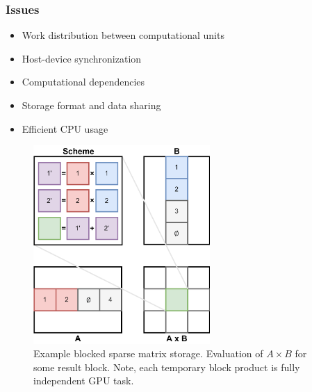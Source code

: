 \documentclass[aspectratio=169,xcolor=table,english]{beamer}
\begin{document}
\begin{frame}[fragile]
\end{frame}

\begin{frame}[fragile] \frametitle{Issues}
    \begin{minipage}[m]{0.55\linewidth}
        \begin{itemize}
            \item Work distribution between computational units
            \item Host-device synchronization
            \item Computational dependencies
            \item Storage format and data sharing
            \item Efficient CPU usage
        \end{itemize}
    \end{minipage}\hfill
    \begin{minipage}[m]{0.45\linewidth}
        \begin{figure}
            \centering
            \includegraphics[width=0.6\textwidth]{figures/blocked_storage.png}
            \caption{Example blocked sparse matrix storage. Evaluation of $A \times B$ for some result block. Note, each temporary block product is fully independent GPU task.}
            \label{fig:blocked_storage}
        \end{figure}
    \end{minipage}
\end{frame}
\end{document}
